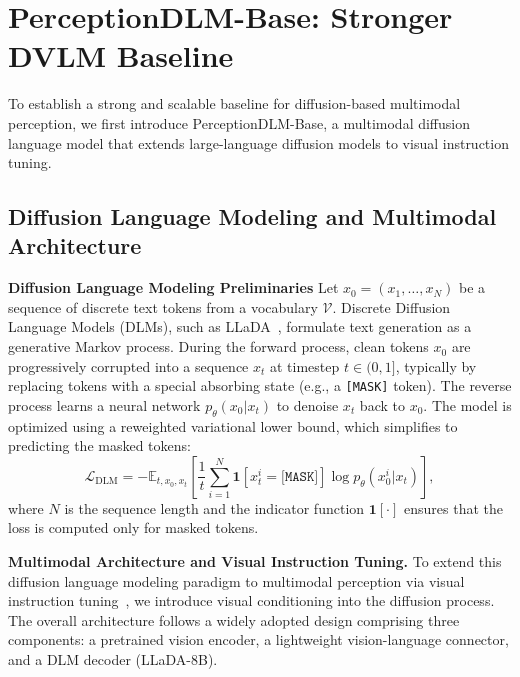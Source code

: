 \vspace{-3mm}
\section{PerceptionDLM-Base: Stronger DVLM Baseline}

To establish a strong and scalable baseline for diffusion-based multimodal perception, we first introduce PerceptionDLM-Base, a multimodal diffusion language model that extends large-language diffusion models to visual instruction tuning. 

\subsection{Diffusion Language Modeling and Multimodal Architecture}

\noindent
\textbf{Diffusion Language Modeling Preliminaries}
Let $x_0 = (x_1, \dots, x_N)$ be a sequence of discrete text tokens from a vocabulary $\mathcal{V}$. Discrete Diffusion Language Models (DLMs), such as LLaDA~\citep{nielarge}, formulate text generation as a generative Markov process. During the forward process, clean tokens $x_0$ are progressively corrupted into a sequence $x_t$ at timestep $t \in (0, 1]$, typically by replacing tokens with a special absorbing state (e.g., a \texttt{[MASK]} token). The reverse process learns a neural network $p_\theta(x_0 | x_t)$ to denoise $x_t$ back to $x_0$. The model is optimized using a reweighted variational lower bound, which simplifies to predicting the masked tokens:
\begin{equation}
\mathcal{L}_{\mathrm{DLM}} = -\mathbb{E}_{t, x_0, x_t} \left[ \frac{1}{t} \sum_{i=1}^{N} \mathbf{1}[x_t^i = \texttt{[MASK]}] \log p_\theta(x_0^i|x_t) \right],
\end{equation}
where $N$ is the sequence length and the indicator function $\mathbf{1}[\cdot]$ ensures that the loss is computed only for masked tokens.

\noindent
\textbf{Multimodal Architecture and Visual Instruction Tuning.}
To extend this diffusion language modeling paradigm to multimodal perception via visual instruction tuning~\citep{liu2023visual}, we introduce visual conditioning into the diffusion process. The overall architecture follows a widely adopted design comprising three components: a pretrained vision encoder, a lightweight vision-language connector, and a DLM decoder (LLaDA-8B).

